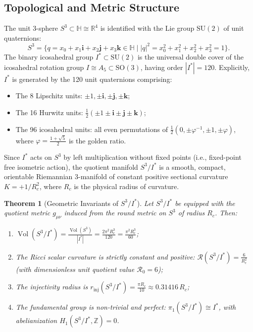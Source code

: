\documentclass[11pt,a4paper]{article}
\newtheorem{theorem}{Theorem}[section]
\theoremstyle{definition}
\newcommand{\R}{\mathbb{R}}
\newcommand{\HH}{\mathbb{H}}
\newcommand{\Z}{\mathbb{Z}}
\newcommand{\SU}{\mathrm{SU}}
\newcommand{\SO}{\mathrm{SO}}
\newcommand{\vol}{\operatorname{Vol}}
\newcommand{\inj}{\mathrm{inj}}
\newcommand{\PDS}{S^3 / I^*}
\newcommand{\Istar}{I^*}
\newcommand{\cR}{\mathcal{R}}
\begin{document}
\subsection{Topological and Metric Structure}
The unit 3-sphere $S^3 \subset \HH \cong \R^4$ is identified with the Lie group $\SU(2)$ of unit quaternions:
\begin{equation}
    S^3 = \{ q = x_0 + x_1 \mathbf{i} + x_2 \mathbf{j} + x_3 \mathbf{k} \in \HH \mid |q|^2 = x_0^2 + x_1^2 + x_2^2 + x_3^2 = 1 \}.
\end{equation}
The binary icosahedral group $\Istar \subset \SU(2)$ is the universal double cover of the icosahedral rotation group $I \cong A_5 \subset \SO(3)$, having order $|\Istar| = 120$. Explicitly, $\Istar$ is generated by the 120 unit quaternions comprising:
\begin{itemize}
    \item The 8 Lipschitz units: $\pm 1, \pm \mathbf{i}, \pm \mathbf{j}, \pm \mathbf{k}$;
    \item The 16 Hurwitz units: $\frac{1}{2}(\pm 1 \pm \mathbf{i} \pm \mathbf{j} \pm \mathbf{k})$;
    \item The 96 icosahedral units: all even permutations of $\frac{1}{2}(0, \pm \varphi^{-1}, \pm 1, \pm \varphi)$, where $\varphi = \frac{1+\sqrt{5}}{2}$ is the golden ratio.
\end{itemize}

Since $\Istar$ acts on $S^3$ by left multiplication without fixed points (i.e., fixed-point free isometric action), the quotient manifold $\PDS$ is a smooth, compact, orientable Riemannian 3-manifold of constant positive sectional curvature $K = +1/R_c^2$, where $R_c$ is the physical radius of curvature.

\begin{theorem}[Geometric Invariants of $\PDS$]
\label{thm:geom_invariants}
Let $\PDS$ be equipped with the quotient metric $g_{\mu\nu}$ induced from the round metric on $S^3$ of radius $R_c$. Then:
\begin{enumerate}
    \item $\vol(\PDS) = \frac{\vol(S^3)}{|\Istar|} = \frac{2\pi^2 R_c^3}{120} = \frac{\pi^2 R_c^3}{60}$;
    \item The Ricci scalar curvature is strictly constant and positive: $\cR(\PDS) = \frac{6}{R_c^2}$ (with dimensionless unit quotient value $\cR_0 = 6$);
    \item The injectivity radius is $\displaystyle r_{\inj}(\PDS) = \frac{\pi R_c}{10} \approx 0.31416\, R_c$;
    \item The fundamental group is non-trivial and perfect: $\pi_1(\PDS) \cong \Istar$, with abelianization $H_1(\PDS, \Z) = 0$.
\end{enumerate}
\end{theorem}
\end{document}
